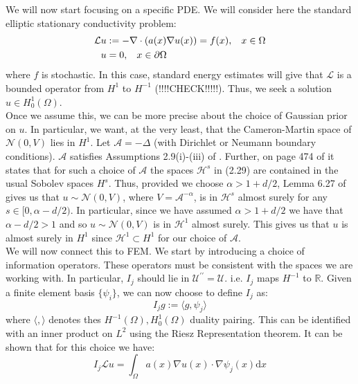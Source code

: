 We will now start focusing on a specific PDE. We will consider here the standard elliptic stationary conductivity problem:
\begin{align}
    \label{standard_conduct}
    \begin{split}
        \mathcal{L}u &:= -\nabla\cdot(a(x)\nabla u(x))=f(x), \hspace{0.3cm} x\in\Omega \\
        u&=0, \hspace{0.3cm} x\in\partial\Omega
    \end{split}
\end{align}
where $f$ is stochastic. In this case, standard energy estimates will give that $\mathcal{L}$ is a bounded operator from $H^1$ to $H^{-1}$ (!!!!CHECK!!!!!). Thus, we seek a solution $u\in H_{0}^{1}(\Omega)$. \\

Once we assume this, we can be more precise about the choice of Gaussian prior on $u$. In particular, we want, at the very least, that the Cameron-Martin space of $\mathcal{N}(0,V)$ lies in $H^1$. Let $\mathcal{A}=-\Delta$ (with Dirichlet or Neumann boundary conditions). $\mathcal{A}$ satisfies Assumptions 2.9(i)-(iii) of \cite{stuart2010inverse}. Further, on page 474 of \cite{stuart2010inverse} it states that for such a choice of $\mathcal{A}$ the spaces $\mathcal{H}^{s}$ in (2.29) are contained in the usual Sobolev spaces $H^s$. Thus, provided we choose $\alpha>1+d/2$, Lemma 6.27 of \cite{stuart2010inverse} gives us that
$u\sim\mathcal{N}(0,V)$, where $V=\mathcal{A}^{-\alpha}$, is in $\mathcal{H}^{s}$ almost surely for any $s\in[0,\alpha-d/2)$. In particular, since we have assumed $\alpha>1+d/2$ we have that $\alpha-d/2>1$ and so $u\sim\mathcal{N}(0,V)$ is in $\mathcal{H}^{1}$ almost surely. This gives us that $u$ is almost surely in $H^1$ since $\mathcal{H}^1\subset H^1$ for our choice of $\mathcal{A}$. \\

We will now connect this to FEM. We start by introducing a choice of information operators. These operators must be consistent with the spaces we are working with. In particular, $I_j$ should lie in $\mathcal{U}^{\prime\prime}=\mathcal{U}$. i.e. $I_j$ maps $H^{-1}$ to $\mathbb{R}$. Given a finite element basis $\{\psi_{i}\}$, we can now choose to define $I_j$ as:
\begin{equation}
    \label{info_operator_def}
    I_{j}g := \langle g, \psi_j \rangle
\end{equation}
where $\langle , \rangle$ denotes thes $H^{-1}(\Omega),H_{0}^{1}(\Omega)$ duality pairing. This can be identified with an inner product on $L^{2}$ using the Riesz Representation theorem. It can be shown that for this choice we have:
\begin{equation}
    \label{info_operator_def_on_Lu}
    I_{j}\mathcal{L}u=\int_{\Omega}a(x)\nabla u(x)\cdot\nabla\psi_{j}(x)\mathrm{d}x
\end{equation}

